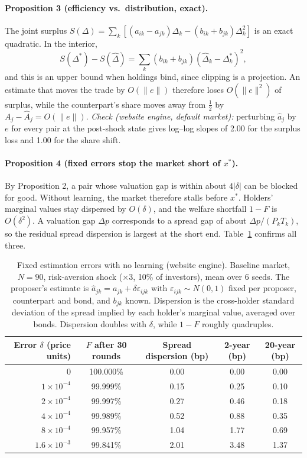 \paragraph{Proposition 3 (efficiency vs.\ distribution, exact).}
The joint surplus $S(\Delta)=\sum_k[(a_{ik}-a_{jk})\Delta_k-(b_{ik}+b_{jk})\Delta_k^2]$ is an exact quadratic. In the interior,
\[
S(\Delta^*)-S(\hat\Delta)=\sum_k(b_{ik}+b_{jk})(\hat\Delta_k-\Delta_k^*)^2,
\]
and this is an upper bound when holdings bind, since clipping is a projection. An estimate that moves the trade by $O(\|e\|)$ therefore loses $O(\|e\|^2)$ of surplus, while the counterpart's share moves away from $\frac12$ by $A_j-\hat A_j=O(\|e\|)$. \emph{Check (website engine, default market):} perturbing $\hat a_j$ by $e$ for every pair at the post-shock state gives log--log slopes of 2.00 for the surplus loss and 1.00 for the share shift.

\paragraph{Proposition 4 (fixed errors stop the market short of $x^*$).}
By Proposition 2, a pair whose valuation gap is within about $4|\delta|$ can be blocked for good. Without learning, the market therefore stalls before $x^*$. Holders' marginal values stay dispersed by $O(\delta)$, and the welfare shortfall $1-F$ is $O(\delta^2)$. A valuation gap $\Delta p$ corresponds to a spread gap of about $\Delta p/(P_kT_k)$, so the residual spread dispersion is largest at the short end. Table~\ref{tab:fixederr} confirms all three.

\begin{table}[h]
\centering\small
\begin{tabular}{rcccc}
\hline
Error $\delta$ (price units) & $F$ after 30 rounds & Spread dispersion (bp) & 2-year (bp) & 20-year (bp) \\
\hline
0                  & 100.000\% & 0.00 & 0.00 & 0.00 \\
$1\times10^{-4}$   & 99.999\%  & 0.15 & 0.25 & 0.10 \\
$2\times10^{-4}$   & 99.997\%  & 0.27 & 0.46 & 0.18 \\
$4\times10^{-4}$   & 99.989\%  & 0.52 & 0.88 & 0.35 \\
$8\times10^{-4}$   & 99.957\%  & 1.04 & 1.77 & 0.69 \\
$1.6\times10^{-3}$ & 99.841\%  & 2.01 & 3.48 & 1.37 \\
\hline
\end{tabular}
\caption{Fixed estimation errors with no learning (website engine). Baseline market, $N=90$, risk-aversion shock ($\times3$, 10\% of investors), mean over 6 seeds. The proposer's estimate is $\hat a_{jk}=a_{jk}+\delta\varepsilon_{ijk}$ with $\varepsilon_{ijk}\sim N(0,1)$ fixed per proposer, counterpart and bond, and $b_{jk}$ known. Dispersion is the cross-holder standard deviation of the spread implied by each holder's marginal value, averaged over bonds. Dispersion doubles with $\delta$, while $1-F$ roughly quadruples.}
\label{tab:fixederr}
\end{table}

